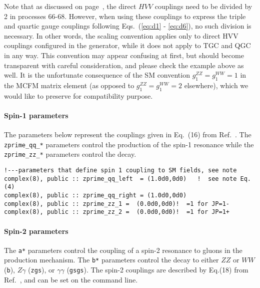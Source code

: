 \documentclass[aps,superscriptaddress,nofootinbib]{revtex4}
\begin{document}
Note that as discussed on page~\pageref{sec:offshell}, the direct $HVV$ couplings need to be divided by 2 in processes 66-68.
However, when using these couplings to express the  triple and quartic gauge couplings following Eqs.~(\ref{eq:d1} - \ref{eq:d6}),
no such division is necessary. In other words, the scaling convention applies only to direct HVV couplings configured in the
generator, while it does not apply to TGC and QGC in any way. This convention may appear confusing at first, but should become
transparent with careful consideration, and please check the example above as well. It is the unfortunate consequence of the
SM convention $g_1^{ZZ}=g_1^{WW}=1$ in the MCFM matrix element (as opposed to $g_1^{ZZ}=g_1^{WW}=2$ elsewhere), 
which we would like to preserve for compatibility purpose. 
\vspace{0.3cm}

\paragraph{Spin-1 parameters}
\label{spin1}

The parameters below represent the couplings given in Eq.~(16) from Ref.~\cite{Bolognesi:2012}. The \verb|zprime_qq_*| parameters control the production of the spin-1 resonance while the \verb|zprime_zz_*| parameters control the decay.

\begin{verbatim}
!---parameters that define spin 1 coupling to SM fields, see note
complex(8), public :: zprime_qq_left  = (1.0d0,0d0)   !  see note Eq. (4)
complex(8), public :: zprime_qq_right = (1.0d0,0d0)
complex(8), public :: zprime_zz_1 =  (0.0d0,0d0)!  =1 for JP=1-
complex(8), public :: zprime_zz_2 =  (0.0d0,0d0)!  =1 for JP=1+
\end{verbatim}

\paragraph{Spin-2 parameters}
\label{spin2}

\noindent
The \verb|a*| parameters control the coupling of a spin-2 resonance to gluons in the production mechanism.  The \verb|b*| parameters control the decay to either $ZZ$ or $WW$ (\verb|b|), $Z\gamma$ (\verb|zgs|), or $\gamma\gamma$ (\verb|gsgs|).
The spin-2 couplings are described by Eq.(18) from Ref.~\cite{Bolognesi:2012}, and can be set on the command line.
\end{document}
